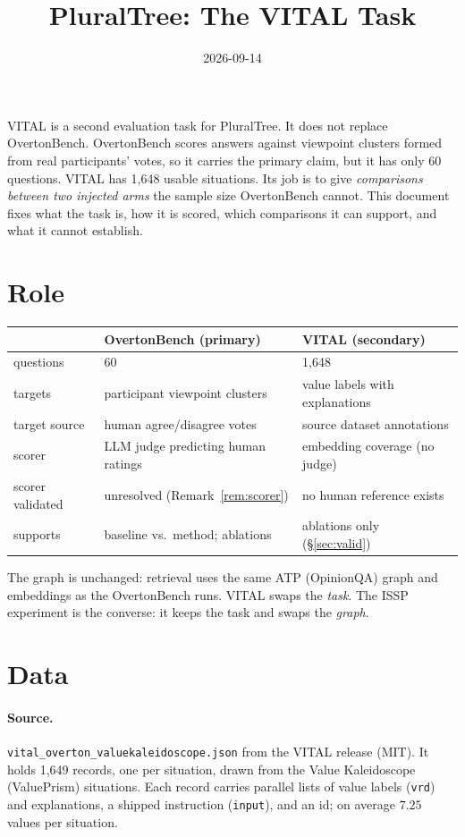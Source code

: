 \documentclass[11pt]{article}
\title{PluralTree: The VITAL Task}
\author{}
\date{2026-09-14}
\theoremstyle{definition}
\newcommand{\1}{\mathbf{1}}
\begin{document}
\maketitle

\noindent
VITAL is a second evaluation task for PluralTree. It does not replace
OvertonBench. OvertonBench scores answers against viewpoint clusters formed from
real participants' votes, so it carries the primary claim, but it has only 60
questions. VITAL has 1{,}648 usable situations. Its job is to give
\emph{comparisons between two injected arms} the sample size OvertonBench cannot.
This document fixes what the task is, how it is scored, which comparisons it can
support, and what it cannot establish.

\section{Role}

\begin{table}[h]
\centering
\begin{tabular}{@{}lll@{}}
\toprule
 & OvertonBench (primary) & VITAL (secondary) \\
\midrule
questions & 60 & 1{,}648 \\
targets & participant viewpoint clusters & value labels with explanations \\
target source & human agree/disagree votes & source dataset annotations \\
scorer & LLM judge predicting human ratings & embedding coverage (no judge) \\
scorer validated & unresolved (Remark~\ref{rem:scorer}) & no human reference exists \\
supports & baseline vs.\ method; ablations & ablations only (\S\ref{sec:valid}) \\
\bottomrule
\end{tabular}
\end{table}

\noindent
The graph is unchanged: retrieval uses the same ATP (OpinionQA) graph and
embeddings as the OvertonBench runs. VITAL swaps the \emph{task}. The ISSP
experiment is the converse: it keeps the task and swaps the \emph{graph}.

\section{Data}

\paragraph{Source.} \texttt{vital\_overton\_valuekaleidoscope.json} from the VITAL
release (MIT). It holds 1{,}649 records, one per situation, drawn from the Value
Kaleidoscope (ValuePrism) situations. Each record carries parallel lists of value
labels (\texttt{vrd}) and explanations, a shipped instruction (\texttt{input}),
and an id; on average $7.25$ values per situation.
\end{document}
